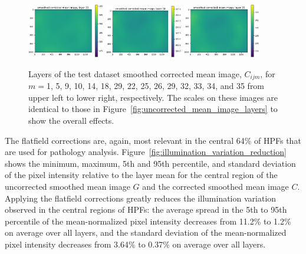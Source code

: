\documentclass[letterpaper,11pt]{article}
\newcommand{\reffig}[1]{Figure~\ref{#1}}
\begin{document}
\begin{figure}[!ht]
\includegraphics[width=0.3\textwidth]{images/results/smoothed_corrected_mean_image_layers/smoothed_corrected_mean_image_layer_33_same_scale}
\includegraphics[width=0.3\textwidth]{images/results/smoothed_corrected_mean_image_layers/smoothed_corrected_mean_image_layer_34_same_scale}
\includegraphics[width=0.3\textwidth]{images/results/smoothed_corrected_mean_image_layers/smoothed_corrected_mean_image_layer_35_same_scale}
\caption{\footnotesize Layers of the test dataset smoothed corrected mean image, $C_{ijm}$, for $m=$1, 5, 9, 10, 14, 18, 29, 22, 25, 26, 29, 32, 33, 34, and 35 from upper left to lower right, respectively. The scales on these images are identical to those in \reffig{fig:uncorrected_mean_image_layers} to show the overall effects.}
\label{fig:corrected_smoothed_mean_image_layers_same_scale}
\end{figure}

The flatfield corrections are, again, most relevant in the central 64\% of HPFs that are used for pathology analysis. \reffig{fig:illumination_variation_reduction} shows the minimum, maximum, 5th and 95th percentile, and standard deviation of the pixel intensity relative to the layer mean for the central region of the uncorrected smoothed mean image $G$ and the corrected smoothed mean image $C$. Applying the flatfield corrections greatly reduces the illumination variation observed in the central regions of HPFs: the average spread in the 5th to 95th percentile of the mean-normalized pixel intensity decreases from 11.2\% to 1.2\% on average over all layers, and the standard deviation of the mean-normalized pixel intensity decreases from 3.64\% to 0.37\% on average over all layers.
\end{document}

